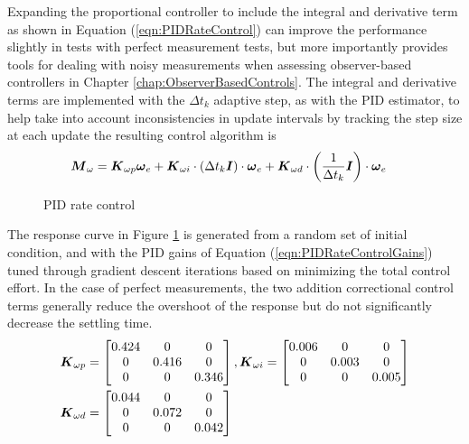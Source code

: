 Expanding the proportional controller to include the integral and derivative term as shown in Equation (\ref{eqn:PIDRateControl}) can improve the performance slightly in tests with perfect measurement tests, but more importantly provides tools for dealing with noisy measurements when assessing observer-based controllers in Chapter \ref{chap:ObserverBasedControls}.  The integral and derivative terms are implemented with the $\Delta t_k$ adaptive step, as with the PID estimator, to help take into account inconsistencies in update intervals by tracking the step size at each update the resulting control algorithm is
\begin{equation}
  \begin{aligned}
    \boldsymbol{M}_{\omega} &= \boldsymbol{K}_{\omega p} \boldsymbol{\omega}_e + \boldsymbol{K}_{\omega i} \cdot (\Delta t_k \boldsymbol{I})\cdot \boldsymbol{\omega}_e + \boldsymbol{K}_{\omega d} \cdot \left(\frac{1}{\Delta t_k} \boldsymbol{I}\right) \cdot \boldsymbol{\omega}_e
  \end{aligned}
  \label{eqn:PIDRateControl}
\end{equation}
\begin{figure}[H]
  \centerline{}
  \caption{PID rate control}
  \label{fig:PIDRateControl}
\end{figure}
The response curve in Figure \ref{fig:PIDRateControl} is generated from a random set of initial condition, and with the PID gains of Equation (\ref{eqn:PIDRateControlGains}) tuned through gradient descent iterations based on minimizing the total control effort.  In the case of perfect measurements, the two addition correctional control terms generally reduce the overshoot of the response but do not significantly decrease the settling time.
\begin{equation}
  \begin{aligned}
    \boldsymbol{K}_{\omega p} &= \begin{bmatrix} 0.424 & 0 & 0 \\ 0 & 0.416 & 0 \\ 0 & 0 & 0.346 \end{bmatrix},
    \boldsymbol{K}_{\omega i} = \begin{bmatrix} 0.006 & 0 & 0 \\ 0 & 0.003 & 0 \\ 0 & 0 & 0.005 \end{bmatrix} \\
    \boldsymbol{K}_{\omega d} &= \begin{bmatrix} 0.044 & 0 & 0 \\ 0 & 0.072 & 0 \\ 0 & 0 & 0.042 \end{bmatrix}
  \end{aligned}
  \label{eqn:PIDRateControlGains}
\end{equation}
